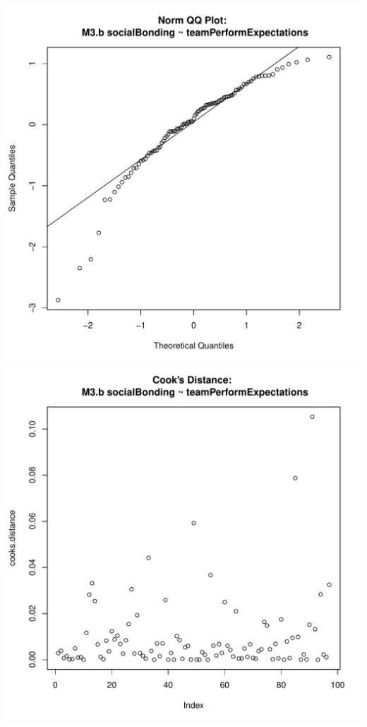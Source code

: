 \documentclass[12pt]{report}
\begin{document}
\includegraphics[scale =.4]{../images/MLM3bQQNorm.pdf}
\includegraphics[scale =.4]{../images/MLM3bCooksD.pdf}
\end{document}

